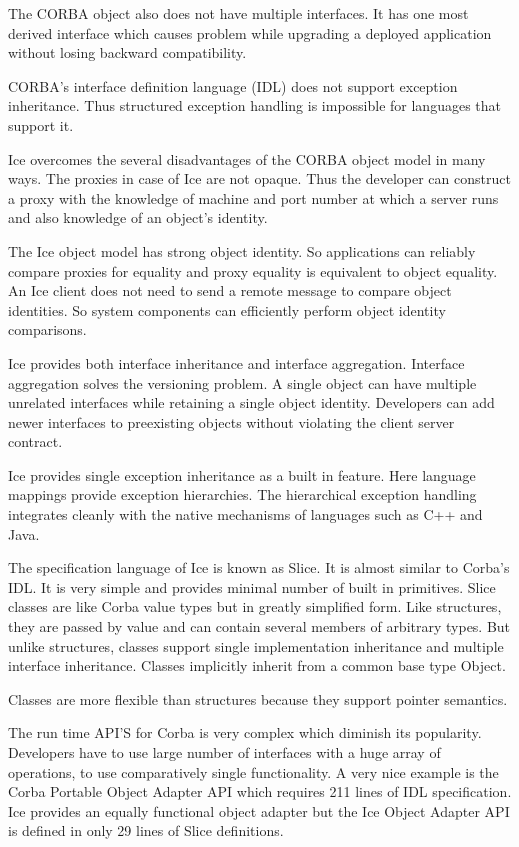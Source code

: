 \documentclass{acm_proc_article-sp}
\begin{document}
The CORBA object also does not have multiple interfaces. It has one most derived interface which causes problem while upgrading a deployed application without losing backward compatibility. 

CORBA's interface definition language (IDL) does not support exception inheritance. Thus structured exception handling is impossible for languages that support it. 

Ice overcomes the several disadvantages of the CORBA object model in many ways. The proxies in case of Ice are not opaque. Thus the developer can construct a proxy with the knowledge of machine and port number at which a server runs and also knowledge of an object's identity. 

The Ice object model has strong object identity. So applications can reliably compare proxies for equality and proxy equality is equivalent to object equality. An Ice client does not need to send a remote message to compare object identities. So system components can efficiently perform object identity comparisons.

Ice provides both interface inheritance and interface aggregation. Interface aggregation solves the versioning problem. A single object can have multiple unrelated interfaces while retaining a single object identity. Developers can add newer interfaces to preexisting objects without violating the client server contract.

Ice provides single exception inheritance as a built in feature. Here language mappings provide exception hierarchies. The hierarchical exception handling integrates cleanly with the native mechanisms of languages such as C++ and Java.

The specification language of Ice is known as Slice. It is almost similar to Corba's IDL.
It is very simple and provides minimal number of built in primitives. 
Slice classes are like Corba value types but in greatly simplified form. Like structures, they are passed by value and can contain several members of arbitrary types. But unlike structures, classes support single implementation inheritance and multiple interface inheritance. Classes implicitly inherit from a common base type Object.

Classes are more flexible than structures because they support pointer semantics. 

The run time API'S for Corba is very complex which diminish its popularity. Developers have to use large number of interfaces with a huge array of operations, to use comparatively single functionality. A very nice example is the Corba Portable Object Adapter API which requires 211 lines of IDL specification. Ice provides an equally functional object adapter but the Ice Object Adapter API  is defined in only 29 lines of Slice definitions.
\end{document}
